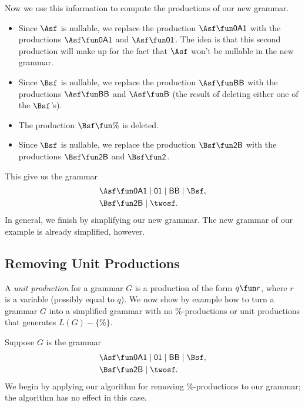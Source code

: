 Now we use this information to compute the productions of
our new grammar.
\begin{itemize}
\item Since $\Asf$ is nullable, we replace the production
  $\Asf\fun\mathsf{0A1}$ with the productions $\Asf\fun\mathsf{0A1}$
  and $\Asf\fun\mathsf{01}$.  The idea is that this second production
  will make up for the fact that $\Asf$ won't be nullable in the new
  grammar.

\item Since $\Bsf$ is nullable, we replace the production
  $\Asf\fun\mathsf{BB}$ with the productions $\Asf\fun\mathsf{BB}$ and
  $\Asf\fun\mathsf{B}$ (the result of deleting either one of the
  $\Bsf$'s).

\item The production $\Bsf\fun\%$ is deleted.

\item Since $\Bsf$ is nullable, we replace the production
  $\Bsf\fun\mathsf{2B}$ with the productions $\Bsf\fun\mathsf{2B}$ and
  $\Bsf\fun\mathsf{2}$.
\end{itemize}
This give us the grammar
\begin{align*}
\Asf &\fun \mathsf{0A1} \mid \mathsf{01} \mid \mathsf{BB} \mid \Bsf , \\
\Bsf &\fun \mathsf{2B} \mid \twosf .
\end{align*}
In general, we finish by simplifying our new grammar.  The new grammar
of our example is already simplified, however.

\subsection{Removing Unit Productions}

A \emph{unit production} for a grammar $G$ is a production of the
form $q\fun r$, where $r$ is a variable (possibly equal to $q$).  We
now show by example how to turn a grammar $G$ into a simplified
grammar with no $\%$-productions or unit productions that generates
$L(G)-\{\%\}$.

Suppose $G$ is the grammar
\begin{align*}
\Asf &\fun \mathsf{0A1} \mid \mathsf{01} \mid \mathsf{BB} \mid \Bsf , \\
\Bsf &\fun \mathsf{2B} \mid \twosf .
\end{align*}
We begin by applying our algorithm for removing $\%$-productions to
our grammar; the algorithm has no effect in this case.

